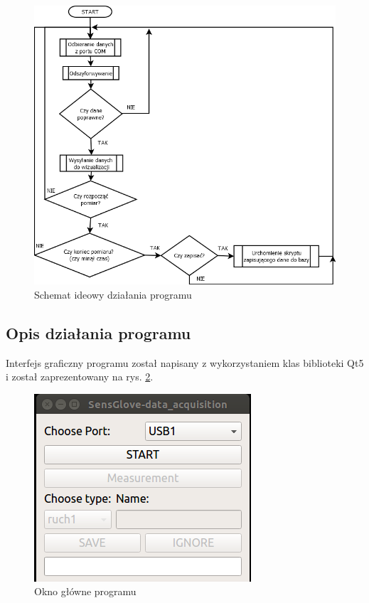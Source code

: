 \documentclass{article}
\begin{document}
\begin{figure}[h!]
    \centering
    \includegraphics[scale=0.6]{programdia.png}
    \caption{Schemat ideowy działania programu}
    \label{rys:programdia}
\end{figure}

\subsection{Opis działania programu}

Interfejs graficzny programu został napisany z wykorzystaniem klas biblioteki Qt5 i został zaprezentowany na rys. \ref{rys:okno}. 
\begin{figure}[h!]
    \centering
    \includegraphics[scale=0.6]{okno.png}
    \caption{Okno główne programu}
    \label{rys:okno}
\end{figure}
\end{document}
